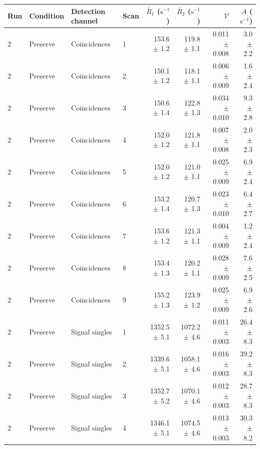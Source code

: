 \begin{tabular}{llllrrrr}
\toprule
Run & Condition & Detection channel & Scan & $\bar R_1$ ($\mathrm{s}^{-1}$) & $\bar R_2$ ($\mathrm{s}^{-1}$) & $\mathcal{V}$ & $A$ ($\mathrm{s}^{-1}$) \\
\midrule
2 & Preserve & Coincidences & 1 & 153.6 \ensuremath{\pm} 1.2 & 119.8 \ensuremath{\pm} 1.1 & 0.011 \ensuremath{\pm} 0.008 & 3.0 \ensuremath{\pm} 2.2 \\
2 & Preserve & Coincidences & 2 & 150.1 \ensuremath{\pm} 1.2 & 118.1 \ensuremath{\pm} 1.1 & 0.006 \ensuremath{\pm} 0.009 & 1.6 \ensuremath{\pm} 2.4 \\
2 & Preserve & Coincidences & 3 & 150.6 \ensuremath{\pm} 1.4 & 122.8 \ensuremath{\pm} 1.3 & 0.034 \ensuremath{\pm} 0.010 & 9.3 \ensuremath{\pm} 2.8 \\
2 & Preserve & Coincidences & 4 & 152.0 \ensuremath{\pm} 1.2 & 121.8 \ensuremath{\pm} 1.1 & 0.007 \ensuremath{\pm} 0.008 & 2.0 \ensuremath{\pm} 2.3 \\
2 & Preserve & Coincidences & 5 & 152.0 \ensuremath{\pm} 1.2 & 121.0 \ensuremath{\pm} 1.1 & 0.025 \ensuremath{\pm} 0.009 & 6.9 \ensuremath{\pm} 2.4 \\
2 & Preserve & Coincidences & 6 & 153.2 \ensuremath{\pm} 1.4 & 120.7 \ensuremath{\pm} 1.3 & 0.023 \ensuremath{\pm} 0.010 & 6.4 \ensuremath{\pm} 2.7 \\
2 & Preserve & Coincidences & 7 & 153.6 \ensuremath{\pm} 1.2 & 121.3 \ensuremath{\pm} 1.1 & 0.004 \ensuremath{\pm} 0.009 & 1.2 \ensuremath{\pm} 2.4 \\
2 & Preserve & Coincidences & 8 & 153.4 \ensuremath{\pm} 1.3 & 120.2 \ensuremath{\pm} 1.1 & 0.028 \ensuremath{\pm} 0.009 & 7.6 \ensuremath{\pm} 2.5 \\
2 & Preserve & Coincidences & 9 & 155.2 \ensuremath{\pm} 1.3 & 123.9 \ensuremath{\pm} 1.2 & 0.025 \ensuremath{\pm} 0.009 & 6.9 \ensuremath{\pm} 2.6 \\
\midrule
2 & Preserve & Signal singles & 1 & 1352.5 \ensuremath{\pm} 5.1 & 1072.2 \ensuremath{\pm} 4.6 & 0.011 \ensuremath{\pm} 0.003 & 26.4 \ensuremath{\pm} 8.3 \\
2 & Preserve & Signal singles & 2 & 1339.6 \ensuremath{\pm} 5.1 & 1058.1 \ensuremath{\pm} 4.6 & 0.016 \ensuremath{\pm} 0.003 & 39.2 \ensuremath{\pm} 8.3 \\
2 & Preserve & Signal singles & 3 & 1352.7 \ensuremath{\pm} 5.2 & 1070.1 \ensuremath{\pm} 4.6 & 0.012 \ensuremath{\pm} 0.003 & 28.7 \ensuremath{\pm} 8.3 \\
2 & Preserve & Signal singles & 4 & 1346.1 \ensuremath{\pm} 5.1 & 1074.5 \ensuremath{\pm} 4.6 & 0.013 \ensuremath{\pm} 0.003 & 30.3 \ensuremath{\pm} 8.2 \\

\end{tabular}
